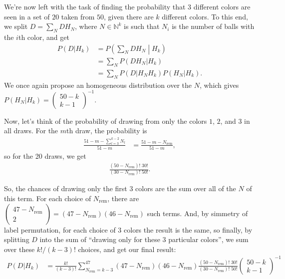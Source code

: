 \documentclass{article}
\begin{document}
We're now left with the task of finding the probability that $3$ different colors are seen in a set of $20$ taken from $50$, given there are $k$ different colors. To this end, we split $D=\sum_NDH_N$, where $N\in\mathbb N^k$ is such that $N_i$ is the number of balls with the $i$th color, and get
\begin{align}
	P(D|H_k)&=P\left(\sum_NDH_N\middle|H_k\right)\\
	&=\sum_NP(DH_N|H_k)\\
	&=\sum_NP(D|H_NH_k)P(H_N|H_k).
\end{align}
We once again propose an homogeneous distribution over the $N$, which gives $P(H_N|H_k)=\begin{pmatrix}50-k\\k-1\end{pmatrix}^{-1}$.

Now, let's think of the probability of drawing from only the colors $1$, $2$, and $3$ in all draws. For the $m$th draw, the probability is
\begin{align}
	\frac{51-m-\sum_{l=3}^{k-2}N_l}{51-m}&=\frac{51-m-N_\text{rem}}{51-m},
\end{align}
so for the 20 draws, we get
\begin{align}
	\frac{\left(50-N_\text{rem}\right)!\;30!}{\left(30-N_\text{rem}\right)!\;50!}.
\end{align}

So, the chances of drawing only the first $3$ colors are the sum over all of the $N$ of this term. For each choice of $N_\text{rem}$, there are $\begin{pmatrix}47-N_\text{rem}\\2\end{pmatrix}=(47-N_\text{rem})(46-N_\text{rem})$ such terms. And, by simmetry of label permutation, for each choice of $3$ colors the result is the same, so finally, by splitting $D$ into the sum of ``drawing only for these $3$ particular colors'', we sum over these $k!/(k-3)!$ choices, and get our final result:
\begin{align}
	P(D|H_k)&=\frac{k!}{(k-3)!}\sum_{N_\text{rem}=k-3}^{47}(47-N_\text{rem})(46-N_\text{rem})\frac{(50-N_\text{rem})!\;30!}{(30-N_\text{rem})!\;50!}\begin{pmatrix}50-k\\k-1\end{pmatrix}^{-1}
\end{align}
\end{document}
